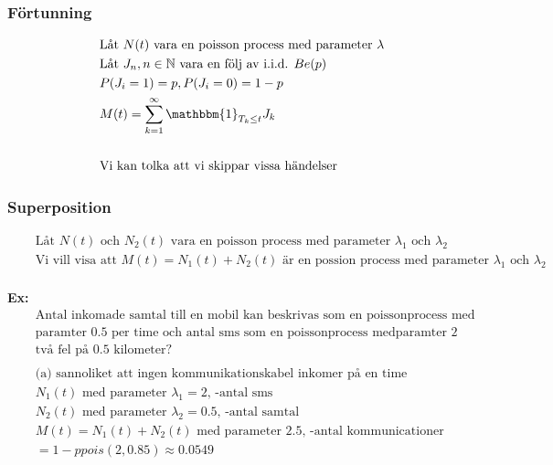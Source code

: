 \subsubsection{Förtunning}
\begin{align*}
  &\quad  \text{Låt $N(t)$ vara en poisson process med parameter $\lambda$ } \\
  &\quad  \text{Låt ${J_n, n\in\mathbb{N}}$ vara en följ av i.i.d. $Be(p)$ } \\
  &\quad  P(J_i=1)=p, P(J_i=0)=1-p \\
  &\quad  M(t) = \sum_{k=1}^{\infty} \mathbbm{1}_{T_k\leq t}J_k \\
  &\quad  \\
  &\quad  \text{Vi kan tolka att vi skippar vissa händelser} \\
\end{align*}

\subsubsection{Superposition}
\begin{align*}
  &\quad  \text{Låt ${N(t)}$ och ${N_2(t)}$ vara en poisson process med parameter $\lambda_1$ och $\lambda_2$} \\
  &\quad  \text{Vi vill visa att $M(t)=N_1(t)+N_2(t)$ är en possion process med parameter $\lambda_1$ och $\lambda_2$} \\
\end{align*}

\textbf{Ex:}
\begin{align*}
  &\quad  \text{Antal inkomade samtal till en mobil kan beskrivas som en poissonprocess med} \\
  &\quad  \text{paramter $0.5$ per time och antal sms som en poissonprocess medparamter 2} \\
  &\quad  \text{två fel på $0.5$ kilometer?} \\
  &\quad  \\
  &\quad  \text{(a) sannoliket att ingen kommunikationskabel inkomer på en time} \\
  &\quad  N_1(t) \text{ med parameter $\lambda_1=2$, -antal sms} \\
  &\quad  N_2(t) \text{ med parameter $\lambda_2=0.5$, -antal samtal} \\
  &\quad  M(t)=N_1(t)+N_2(t) \text{ med parameter $2.5$, -antal kommunicationer} \\
  &\quad  = 1-ppois(2, 0.85) \approx 0.0549 \\
\end{align*}

